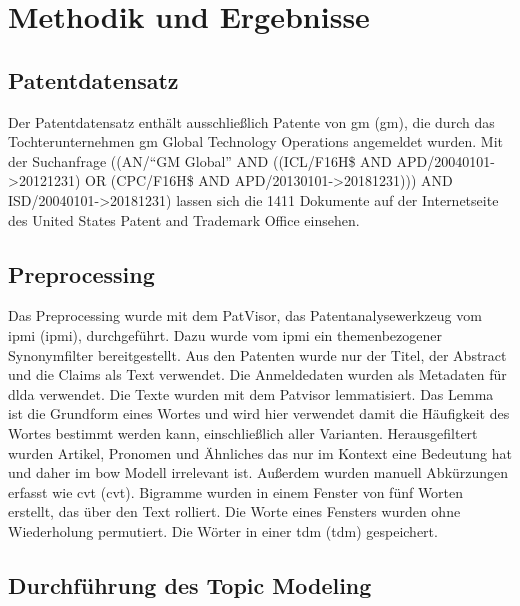 \chapter{Methodik und Ergebnisse}

\section{Patentdatensatz}
Der Patentdatensatz enthält ausschließlich Patente von \acl{gm} (\ac{gm}), die durch das Tochterunternehmen \ac{gm} Global Technology Operations angemeldet wurden. Mit der Suchanfrage ((AN/\enquote{GM Global} AND ((ICL/F16H\$ AND APD/20040101->20121231) OR (CPC/F16H\$ AND APD/20130101->20181231))) AND ISD/20040101->20181231)  lassen sich die 1411 Dokumente auf der Internetseite des United States Patent and Trademark Office einsehen. 

\section{Preprocessing}
Das Preprocessing wurde mit dem PatVisor\textregistered, das Patentanalysewerkzeug vom \acl{ipmi} (\ac{ipmi}), durchgeführt. Dazu wurde vom \ac{ipmi} ein themenbezogener Synonymfilter bereitgestellt. Aus den Patenten wurde nur der Titel, der Abstract und die Claims als Text verwendet. Die Anmeldedaten wurden als Metadaten für \ac{dlda} verwendet. Die Texte wurden mit dem Patvisor lemmatisiert. Das Lemma ist die Grundform eines Wortes und wird hier verwendet damit die Häufigkeit des Wortes bestimmt werden kann, einschließlich aller Varianten. Herausgefiltert wurden Artikel, Pronomen und Ähnliches das nur im Kontext eine Bedeutung hat und daher im \acl{bow} Modell irrelevant ist. Außerdem wurden manuell Abkürzungen erfasst wie \acl{cvt} (\ac{cvt}). Bigramme wurden in einem Fenster von fünf Worten erstellt, das über den Text rolliert. Die Worte eines Fensters wurden ohne Wiederholung permutiert. Die Wörter in einer \acl{tdm} (\ac{tdm}) gespeichert.

\section{Durchführung des Topic Modeling}

